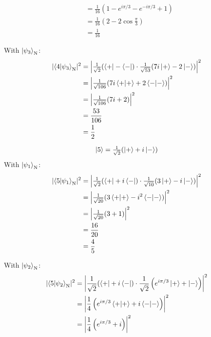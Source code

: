 \documentclass[11pt]{article}
\newcommand\abs[1]{\lvert#1\rvert}
\newcommand\Abs[1]{\left\lvert#1\right\rvert}
\begin{document}
\begin{enumerate}[label=\textbf{\arabic*.}, start=2]
{\begin{enumerate}[label=\textbf{(\alph*)}]
{\begin{align*}
                        &=\frac{1}{16}\left(1-e^{i\pi/3}-e^{-i\pi/3}+1\right) \\
                        &=\frac{1}{16}\left(2-2\cos\tfrac{\pi}{3}\right) \\
                        &=\frac{1}{16}
                    \end{align*}
                    \par
                    With \(\ket{\psi_3}_\mathrm{N}\):
                    \begin{align*}
                        \abs{\braket{4|\psi_3}_\mathrm{N}}^2&=\Abs{\tfrac{1}{\sqrt 2}(\bra{+}-\bra{-})\cdot\tfrac{1}{\sqrt{53}}(7i\ket{+}-2\ket{-})}^2 \\
                        &=\Abs{\tfrac{1}{\sqrt{106}}(7i\braket{+|+}+2\braket{-|-})}^2 \\
                        &=\Abs{\tfrac{1}{\sqrt{106}}(7i+2)}^2 \\
                        &=\frac{53}{106} \\
                        &=\frac 1 2
                    \end{align*}
                    \par
                    {\boldmath \[\ket{5}=\tfrac{1}{\sqrt 2}(\ket{+}+i\ket{-})\]}
                    With \(\ket{\psi_1}_\mathrm{N}\):
                    \begin{align*}
                        \abs{\braket{5|\psi_1}_\mathrm{N}}^2&=\Abs{\tfrac{1}{\sqrt 2}(\bra{+}+i\bra{-})\cdot\tfrac{1}{\sqrt{10}}(3\ket{+}-i\ket{-})}^2 \\
                        &=\Abs{\tfrac{1}{\sqrt{20}}(3\braket{+|+}-i^2\braket{-|-})}^2 \\
                        &=\Abs{\tfrac{1}{\sqrt{20}}(3+1)}^2 \\
                        &=\frac{16}{20} \\
                        &=\frac 4 5
                    \end{align*}
                    \par
                    With \(\ket{\psi_2}_\mathrm{N}\):
                    \begin{align*}
                        \abs{\braket{5|\psi_2}_\mathrm{N}}^2&=\Abs{\frac{1}{\sqrt 2}(\bra{+}+i\bra{-})\cdot\frac{1}{\sqrt 2}\left(e^{i\pi/3}\ket{+}+\ket{-}\right)}^2 \\
                        &=\Abs{\frac 1 4 \left(e^{i\pi/3}\braket{+|+}+i\braket{-|-}\right)}^2 \\
                        &=\Abs{\frac 1 4 \left(e^{i\pi/3}+i\right)}^2 \\

\end{align*}}
\end{enumerate}}
\end{enumerate}
\end{document}
